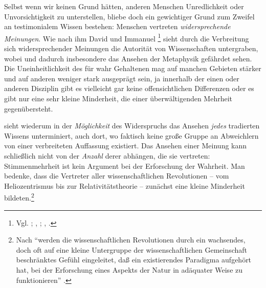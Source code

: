 \begin{nummerierung}
 \item{}\label{Abschnitt:DescartesundderWiderstreitderMeinungen}
 Selbst wenn wir keinen Grund hätten, anderen Menschen Unredlichkeit oder
 Unvorsichtigkeit zu unterstellen, bliebe doch ein gewichtiger Grund zum Zweifel
 an testimonialem Wissen bestehen: Menschen vertreten \emph{widersprechende Meinungen}. Wie nach
 ihm David  und Immanuel \footnote{Vgl.
 \cite[][3]{Hume:ATreatiseofHumenNature2007}; \cite[][A
 ix]{Kant:KritikderreinenVernunft2003}, \cite[][IV:
 8.4--9]{Kant:GesammelteWerke1900ff.}; \cite[][B
 vii--ix]{Kant:KritikderreinenVernunft2003}, \cite[][III:
 7.2--8.25]{Kant:GesammelteWerke1900ff.}.} sieht  durch die
 Verbreitung sich widersprechender Meinungen die Autorität von Wissenschaften
 untergraben, wobei  und  dadurch insbesondere das Ansehen
 der Metaphysik gefährdet sehen. Die Uneinheitlichkeit des für wahr
 Gehaltenen mag auf manchen Gebieten stärker und auf anderen weniger stark
 ausgeprägt sein, ja innerhalb der einen oder anderen Disziplin gibt es
 vielleicht gar keine offensichtlichen Differenzen oder es gibt nur eine sehr kleine
 Minderheit, die einer überwältigenden Mehrheit gegenübersteht.
 
  sieht wiederum in der \emph{Möglichkeit} des
 Widerspruchs das Ansehen \emph{jedes} tradierten Wissens unterminiert, auch
 dort, wo faktisch keine große Gruppe an Abweichlern von einer verbreiteten
 Auffassung existiert. Das Ansehen einer Meinung kann schließlich nicht von der
 \emph{Anzahl} derer abhängen, die sie vertreten:
 Stimmenmehrheit ist kein Argument bei der Erforschung der Wahrheit. Man
 bedenke, dass die Vertreter aller wissenschaftlichen Revolutionen -- vom
 Heliozentrismus bis zur Relativitätstheorie -- zunächst eine kleine Minderheit
 bildeten.\footnote{Nach
 \enquote{werden die wissenschaftlichen Revolutionen durch ein wachsendes, doch
 {\punkt} oft auf eine kleine Untergruppe der wissenschaftlichen Gemeinschaft
 beschränktes Gefühl eingeleitet, daß ein existierendes Paradigma aufgehört hat,
 bei der Erforschung eines Aspekts der Natur {\punkt} in adäquater Weise zu
 funktionieren}
 \parencite[][104]{Kuhn:DieStrukturwissenschaftlicherRevolutionen1967}.}
 

\end{nummerierung}
